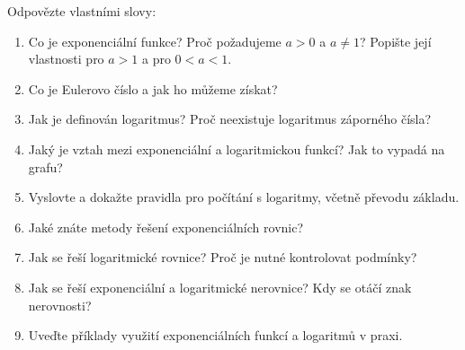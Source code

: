 \begin{problem}
  Odpovězte vlastními slovy:
  \begin{enumerate}
    \item Co je exponenciální funkce? Proč požadujeme $a > 0$ a $a\neq 1$? Popište její vlastnosti pro $a > 1$ a pro $0 < a < 1$.
    \item Co je Eulerovo číslo a jak ho můžeme získat?
    \item Jak je definován logaritmus? Proč neexistuje logaritmus záporného čísla?
    \item Jaký je vztah mezi exponenciální a logaritmickou funkcí? Jak to vypadá na grafu?
    \item Vyslovte a dokažte pravidla pro počítání s logaritmy, včetně převodu základu.
    \item Jaké znáte metody řešení exponenciálních rovnic?
    \item Jak se řeší logaritmické rovnice? Proč je nutné kontrolovat podmínky?
    \item Jak se řeší exponenciální a logaritmické nerovnice? Kdy se otáčí znak nerovnosti?
    \item Uveďte příklady využití exponenciálních funkcí a logaritmů v praxi.
  \end{enumerate}
\end{problem}
